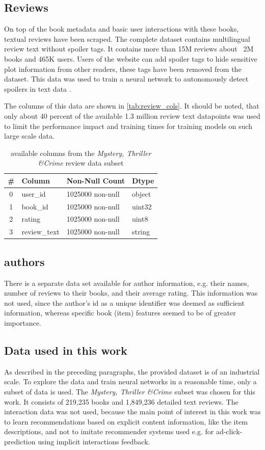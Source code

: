 \documentclass[10pt,final,journal,a4paper,oneside,twocolumn]{IEEEtran}
\begin{document}
\subsection{Reviews}
On top of the book metadata and basic user interactions with these books, textual reviews have been scraped. The complete dataset contains multilingual review text without spoiler tags. It contains more than 15M reviews about ~2M books and 465K users. Users of the website can add spoiler tags to hide sensitive plot information from other readers, these tags have been removed from the dataset. This data was used to train a neural network to autonomously detect spoilers in text data \cite{Wan.2019}.

The columns of this data are shown in \autoref{tab:review_cols}. It should be noted, that only about 40 percent of the available 1.3 million review text datapoints was used to limit the performance impact and training times for training models on such large scale data.
\begin{table}[h]
    \centering
    \caption{available columns from the \emph{Mystery, Thriller \&Crime} review data subset}
    \begin{tabular}{clll}
            \toprule
            \# & Column & Non-Null Count & Dtype \\
            \midrule
            0 & user\_id & 1025000  non-null & object \\
            1 & book\_id & 1025000  non-null & uint32 \\
            2 & rating & 1025000  non-null & uint8 \\
            3 & review\_text & 1025000  non-null & string \\
            \bottomrule
            \end{tabular}        
            \label{tab:review_cols}
\end{table}

\subsection{authors}
There is a separate data set available for author information, e.g. their names, number of reviews to their books, and their average rating. This information was not used, since the author's id as a unique identifier was deemed as sufficient information, whereas specific book (item) features seemed to be of greater importance.

\subsection{Data used in this work}\label{sec:data_used}
As described in the preceding paragraphs, the provided dataset is of an industrial scale. To explore the data and train neural networks in a reasonable time, only a subset of data is used.
The \emph{Mystery, Thriller \&Crime} subset was chosen for this work. It consists of 219,235 books and 1,849,236 detailed text reviews. The interaction data was not used, because the main point of interest in this work was to learn recommendations based on explicit content information, like the item descriptions, and not to imitate recommender systems used e.g. for ad-click-prediction using implicit interactions feedback.
\end{document}
